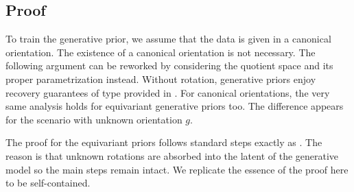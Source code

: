
\subsection{Proof}
To train the generative prior, we assume that the data is given in a canonical orientation. The existence of a canonical orientation is not necessary. The following argument can be reworked by considering the quotient space and its proper parametrization instead. Without rotation, generative priors enjoy recovery guarantees of type provided in \citet{Bora2017-as}. For canonical orientations, the very same analysis holds for equivariant generative priors too.  The difference appears for the scenario with unknown orientation $g$. 

The proof for the equivariant priors follows standard steps exactly as \citet{Bora2017-as}. The reason is that unknown rotations are absorbed into the latent of the generative model so the main steps remain intact. We replicate the essence of the proof here to be self-contained.

